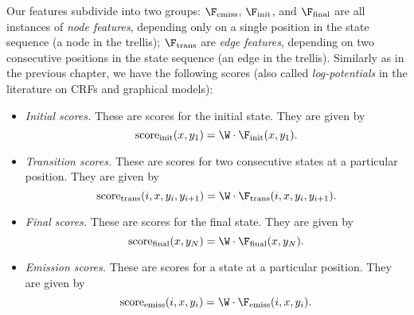 Our features subdivide into two groups: 
$\F_{\mathrm{emiss}}$, $\F_{\mathrm{init}}$, 
and $\F_{\mathrm{final}}$ are all instances of 
\emph{node features}, 
depending only on a single position in the
state sequence (a node in the trellis); 
$\F_{\mathrm{trans}}$ 
are \emph{edge features},
depending on two consecutive positions in the state 
sequence (an edge in the trellis).
Similarly as in the previous chapter, we have the following scores (also called 
\emph{log-potentials} in the literature on CRFs and graphical models):
\begin{itemize}
\item \emph{Initial scores.}
These are scores for the initial state. 
They are given by 
\begin{equation}
{\mathrm{score}}_{\mathrm{init}}(x,y_1) = \W \cdot \F_{\mathrm{init}}(x,y_1).
\end{equation} 
\item \emph{Transition scores.}
These are scores for two consecutive states at a particular position. 
They are given by 
\begin{equation}
{\mathrm{score}}_{\mathrm{trans}}(i,x,y_i,y_{i+1}) = \W \cdot \F_{\mathrm{trans}}(i,x,y_{i},y_{i+1}).
\end{equation} 
\item \emph{Final scores.}
These are scores for the final state. 
They are given by 
\begin{equation}
{\mathrm{score}}_{\mathrm{final}}(x,y_N) = \W \cdot \F_{\mathrm{final}}(x,y_N).
\end{equation} 
\item \emph{Emission scores.}
These are scores for a state at a particular position. 
They are given by 
\begin{equation}\label{dis_node_potentials}
{\mathrm{score}}_{\mathrm{emiss}}(i,x,y_i) = \W \cdot \F_{\mathrm{emiss}}(i,x,y_i).
\end{equation} 
\end{itemize}
